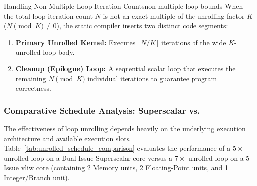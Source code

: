 \begin{concept}{Handling Non-Multiple Loop Iteration Counts}{non-multiple-loop-bounds}
    When the total loop iteration count $N$ is not an exact multiple of the unrolling factor $K$ ($N \pmod K \neq 0$), the static compiler inserts two distinct code segments:
    \begin{enumerate}
        \item \textbf{Primary Unrolled Kernel:} Executes $\lfloor N / K \rfloor$ iterations of the wide $K$-unrolled loop body.
        \item \textbf{Cleanup (Epilogue) Loop:} A sequential scalar loop that executes the remaining $N \pmod K$ individual iterations to guarantee program correctness.
    \end{enumerate}
\end{concept}

\subsubsection{Comparative Schedule Analysis: Superscalar vs. }

The effectiveness of loop unrolling depends heavily on the underlying execution architecture and available execution slots. Table~\ref{tab:unrolled_schedule_comparison} evaluates the performance of a $5\times$ unrolled loop on a Dual-Issue Superscalar core versus a $7\times$ unrolled loop on a 5-Issue \gls{vliw} core (containing 2 Memory units, 2 Floating-Point units, and 1 Integer/Branch unit).

